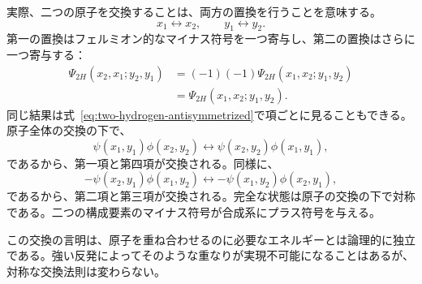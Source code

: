 \begin{classroomqa}
\end{classroomqa}

実際、二つの原子を交換することは、両方の置換を行うことを意味する。
\begin{equation}
x_1\leftrightarrow x_2,
\qquad
y_1\leftrightarrow y_2.
\end{equation}
第一の置換はフェルミオン的なマイナス符号を一つ寄与し、第二の置換はさらに一つ寄与する：
\begin{equation}
\begin{aligned}
\Psi_{2H}(x_2,x_1;y_2,y_1)
&=(-1)(-1)\Psi_{2H}(x_1,x_2;y_1,y_2)\\
&=\Psi_{2H}(x_1,x_2;y_1,y_2).
\end{aligned}
\end{equation}
同じ結果は式~\eqref{eq:two-hydrogen-antisymmetrized}で項ごとに見ることもできる。原子全体の交換の下で、
\begin{equation}
\psi(x_1,y_1)\phi(x_2,y_2)
\longleftrightarrow
\psi(x_2,y_2)\phi(x_1,y_1),
\end{equation}
であるから、第一項と第四項が交換される。同様に、
\begin{equation}
-\psi(x_2,y_1)\phi(x_1,y_2)
\longleftrightarrow
-\psi(x_1,y_2)\phi(x_2,y_1),
\end{equation}
であるから、第二項と第三項が交換される。完全な状態は原子の交換の下で対称である。二つの構成要素のマイナス符号が合成系にプラス符号を与える。

この交換の言明は、原子を重ね合わせるのに必要なエネルギーとは論理的に独立である。強い反発によってそのような重なりが実現不可能になることはあるが、対称な交換法則は変わらない。

\begin{classroomqa}
\end{classroomqa}

